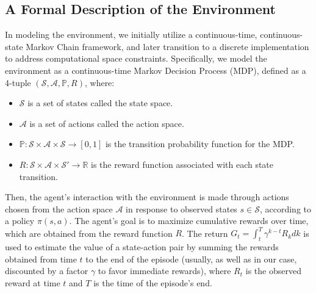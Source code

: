 \subsection{A Formal Description of the Environment}
\label{subsec:formal-description-of-the-rl-environment}
In modeling the environment, we initially utilize a continuous-time, continuous-state Markov Chain framework,
and later transition to a discrete implementation to address computational space constraints.
Specifically, we model the environment as a continuous-time Markov Decision Process (MDP),
defined as a 4-tuple $ (\mathcal{S}, \mathcal{A}, \mathbb{P}, R) $, where:

\begin{itemize}
    \item $\mathcal{S}$ is a set of states called the state space.
    \item $\mathcal{A}$ is a set of actions called the action space.
    \item $\mathbb{P}: \mathcal{S} \times \mathcal{A} \times \mathcal{S} \to [0, 1]$ is the transition probability function for the MDP.
    \item $R: \mathcal{S} \times \mathcal{A} \times \mathcal{S}' \rightarrow \mathbb{R}$ is the reward function associated with each state transition.
\end{itemize}

Then, the agent's interaction with the environment is made through actions chosen from the action space $\mathcal{A}$ in response to observed states $s \in \mathcal{S}$,
according to a policy $\pi (s, a)$.
The agent's goal is to maximize cumulative rewards over time, which are obtained from the reward function $R$.
The return $G_t = \int_{t}^{T} \gamma^{k-t} R_{k} dk$ is used to estimate the value of a state-action pair by summing the rewards obtained from time $t$ to the end of the episode
(usually, as well as in our case, discounted by a factor $\gamma$ to favor immediate rewards),
where $R_{t}$ is the observed reward at time $t$ and $T$ is the time of the episode's end.

